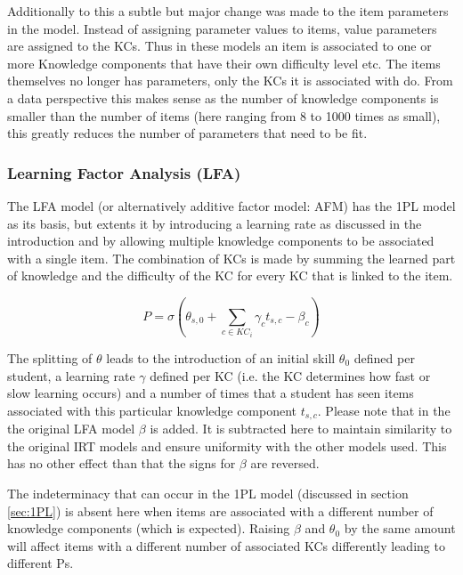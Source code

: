 \documentclass{scrartcl}
\begin{document}
Additionally to this a subtle but major change was made to the item parameters in the model. Instead of assigning parameter values to items, value parameters are assigned to the KCs. Thus in these models an item is associated to one or more Knowledge components that have their own difficulty level etc. The items themselves no longer has parameters, only the KCs it is associated with do. From a data perspective this makes sense as the number of knowledge components is smaller than the number of items (here ranging from 8 to 1000 times as small), this greatly reduces the number of parameters that need to be fit.

\subsubsection{Learning Factor Analysis (LFA)}
\label{sec:AFM}
The LFA model (or alternatively additive factor model: AFM) has the 1PL model as its basis, but extents it by introducing a learning rate as discussed in the introduction and by allowing multiple knowledge components to be associated with a single item. The combination of KCs is made by summing the learned part of knowledge and the difficulty of the KC for every KC that is linked to the item.

\begin{equation}
\label{eq:afm}
P = \sigma(\theta_{s,0} + \sum_{c \in KC_{i}}  \gamma_{c} t_{s,c} - \beta_{c})
\end{equation}

The splitting of $\theta$ leads to the introduction of an initial skill $\theta_{0}$ defined per student, a learning rate $\gamma$ defined per KC (i.e. the KC determines how fast or slow learning occurs) and a number of times that a student has seen items associated with this particular knowledge component $t_{s,c}$. Please note that in the the original LFA model $\beta$ is added. It is subtracted here to maintain similarity to the original IRT models and ensure uniformity with the other models used. This has no other effect than that the signs for $\beta$ are reversed.

The indeterminacy that can occur in the 1PL model (discussed in section \ref{sec:1PL}) is absent here when items are associated with a different number of knowledge components (which is expected). Raising $\beta$ and $\theta_{0}$ by the same amount will affect items with a different number of associated KCs differently leading to different Ps. 
\end{document}
